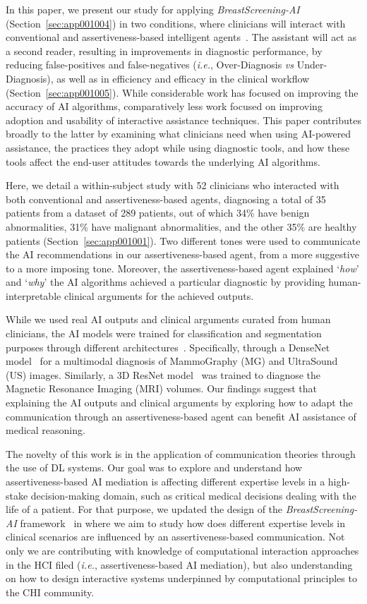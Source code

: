 In this paper, we present our study for applying {\it BreastScreening-AI} (Section~\ref{sec:app001004}) in two conditions, where clinicians will interact with conventional and assertiveness-based intelligent agents~\cite{pacheco2019alignment, 10.1145/3311350.3347162}.
The assistant will act as a second reader, resulting in improvements in diagnostic performance, by reducing false-positives and false-negatives ({\it i.e.}, Over-Diagnosis {\it vs} Under-Diagnosis), as well as in efficiency and efficacy in the clinical workflow (Section~\ref{sec:app001005}).
While considerable work has focused on improving the accuracy of AI algorithms, comparatively less work focused on improving adoption and usability of interactive assistance techniques.
This paper contributes broadly to the latter by examining what clinicians need when using AI-powered assistance, the practices they adopt while using diagnostic tools, and how these tools affect the end-user attitudes towards the underlying AI algorithms.

Here, we detail a within-subject study with 52 clinicians who interacted with both conventional and assertiveness-based agents, diagnosing a total of 35 patients from a dataset of 289 patients, out of which 34\% have benign abnormalities, 31\% have malignant abnormalities, and the other 35\% are healthy patients (Section~\ref{sec:app001001}).
Two different tones were used to communicate the AI recommendations in our assertiveness-based agent, from a more suggestive to a more imposing tone.
Moreover, the assertiveness-based agent explained `{\it how}' and `{\it why}' the AI algorithms achieved a particular diagnostic by providing human-interpretable clinical arguments for the achieved outputs.

While we used real AI outputs and clinical arguments curated from human clinicians, the AI models were trained for classification and segmentation purposes through different architectures~\cite{HANCER2023321}.
Specifically, through a DenseNet model~\cite{8721151} for a multimodal diagnosis of MammoGraphy (MG) and UltraSound (US) images.
Similarly, a 3D ResNet model~\cite{Aldoj2020} was trained to diagnose the Magnetic Resonance Imaging (MRI) volumes.
Our findings suggest that explaining the AI outputs and clinical arguments by exploring how to adapt the communication through an assertiveness-based agent can benefit AI assistance of medical reasoning.

The novelty of this work is in the application of communication theories through the use of DL systems.
Our goal was to explore and understand how assertiveness-based AI mediation is affecting different expertise levels in a high-stake decision-making domain, such as critical medical decisions dealing with the life of a patient.
For that purpose, we updated the design of the {\it BreastScreening-AI} framework~\cite{CALISTO2022102285} in where we aim to study how does different expertise levels in clinical scenarios are influenced by an assertiveness-based communication.
Not only we are contributing with knowledge of computational interaction approaches in the HCI filed ({\it i.e.}, assertiveness-based AI mediation), but also understanding on how to design interactive systems underpinned by computational principles to the CHI community.

